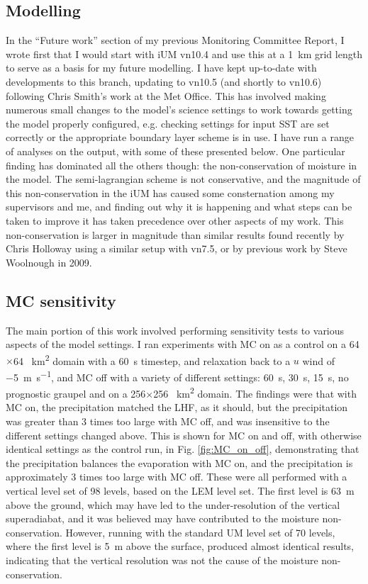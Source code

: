 \documentclass[11pt,a4paper]{article}
\begin{document}
\subsection{Modelling}
\label{sec:modelling}
In the ``Future work'' section of my previous Monitoring Committee Report, I wrote first that I would start with iUM vn10.4 and use this at a \SI{1}{km} grid length to serve as a basis for my future modelling. I have kept up-to-date with developments to this branch, updating to vn10.5 (and shortly to vn10.6) following Chris Smith's work at the Met Office. This has involved making numerous small changes to the model's science settings to work towards getting the model properly configured, e.g. checking settings for input SST are set correctly or the appropriate boundary layer scheme is in use. I have run a range of analyses on the output, with some of these presented below. One particular finding has dominated all the others though: the non-conservation of moisture in the model. The semi-lagrangian scheme is not conservative, and the magnitude of this non-conservation in the iUM has caused some consternation among my supervisors and me, and finding out why it is happening and what steps can be taken to improve it has taken precedence over other aspects of my work. This non-conservation is larger in magnitude than similar results found recently by Chris Holloway using a similar setup with vn7.5, or by previous work by Steve Woolnough in 2009.

\subsection{MC sensitivity}
\label{sec:MC_sensitivity}
The main portion of this work involved performing sensitivity tests to various aspects of the model settings. I ran experiments with MC on as a control on a 64$\times$64 \SI{}{km^2} domain with a \SI{60}{s} timestep, and relaxation back to a $u$ wind of \SI{-5}{m.s^{-1}}, and MC off with a variety of different settings: \SI{60}{s}, \SI{30}{s}, \SI{15}{s}, no prognostic graupel and on a 256$\times$256 \SI{}{km^2} domain. The findings were that with MC on, the precipitation matched the LHF, as it should, but the precipitation was greater than 3 times too large with MC off, and was insensitive to the different settings changed above. This is shown for MC on and off, with otherwise identical settings as the control run, in Fig. \ref{fig:MC_on_off}, demonstrating that the precipitation balances the evaporation with MC on, and the precipitation is approximately 3 times too large with MC off. These were all performed with a vertical level set of 98 levels, based on the LEM level set. The first level is \SI{63}{m} above the ground, which may have led to the under-resolution of the vertical superadiabat, and it was believed may have contributed to the moisture non-conservation. However, running with the standard UM level set of 70 levels, where the first level is \SI{5}{m} above the surface, produced almost identical results, indicating that the vertical resolution was not the cause of the moisture non-conservation. 
\end{document}
